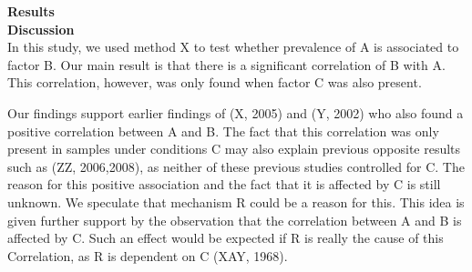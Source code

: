\documentclass[justified, notoc]{tufte-book} %
\begin{document}
\noindent\Large{\textbf{Results}}\\

\noindent\Large{\textbf{Discussion}}\\
In this study, we used method X to test whether prevalence of A
is associated to factor B. Our main result is that there is a
significant correlation of B with A. This correlation, however, was
only found when factor C was also present.

Our findings support earlier findings of (X, 2005) and (Y, 2002)
who also found a positive correlation between A and B. The fact
that this correlation was only present in samples under conditions
C may also explain previous opposite results such as (ZZ,
2006,2008), as neither of these previous studies controlled for C.
The reason for this positive association and the fact that it is
affected by C is still unknown. We speculate that mechanism R
could be a reason for this. This idea is given further support by
the observation that the correlation between A and B is affected
by C. Such an effect would be expected if R is really the cause of
this Correlation, as R is dependent on C (XAY, 1968).






\end{document}
